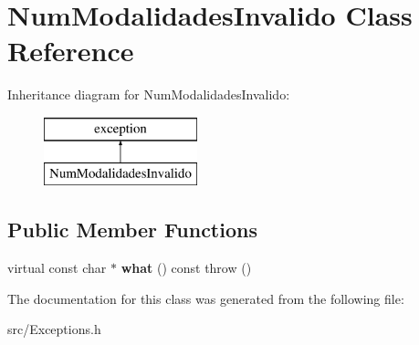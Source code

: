 \hypertarget{class_num_modalidades_invalido}{}\section{Num\+Modalidades\+Invalido Class Reference}
\label{class_num_modalidades_invalido}
Inheritance diagram for Num\+Modalidades\+Invalido\+:\begin{figure}[H]
\begin{center}
\leavevmode
\includegraphics[height=2.000000cm]{class_num_modalidades_invalido}
\end{center}
\end{figure}
\subsection*{Public Member Functions}
\begin{DoxyCompactItemize}
\item 
\hypertarget{class_num_modalidades_invalido_afd6000e26dddd366ab91f604d312c597}{}virtual const char $\ast$ {\bfseries what} () const   throw ()\label{class_num_modalidades_invalido_afd6000e26dddd366ab91f604d312c597}

\end{DoxyCompactItemize}


The documentation for this class was generated from the following file\+:\begin{DoxyCompactItemize}
\item 
src/Exceptions.\+h\end{DoxyCompactItemize}
